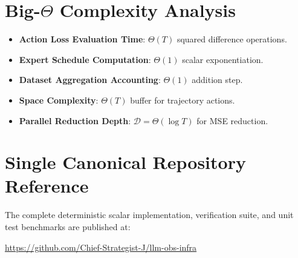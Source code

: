 \documentclass[11pt,a4paper]{article}
\theoremstyle{definition}
\begin{document}
\section{Big-$\Theta$ Complexity Analysis}

\begin{itemize}
    \item \textbf{Action Loss Evaluation Time}: $\Theta(T)$ squared difference operations.
    \item \textbf{Expert Schedule Computation}: $\Theta(1)$ scalar exponentiation.
    \item \textbf{Dataset Aggregation Accounting}: $\Theta(1)$ addition step.
    \item \textbf{Space Complexity}: $\Theta(T)$ buffer for trajectory actions.
    \item \textbf{Parallel Reduction Depth}: $\mathcal{D} = \Theta(\log T)$ for MSE reduction.
\end{itemize}

\section{Single Canonical Repository Reference}

The complete deterministic scalar implementation, verification suite, and unit test benchmarks are published at:
\begin{center}
\url{https://github.com/Chief-Strategist-J/llm-obs-infra}
\end{center}
\end{document}
